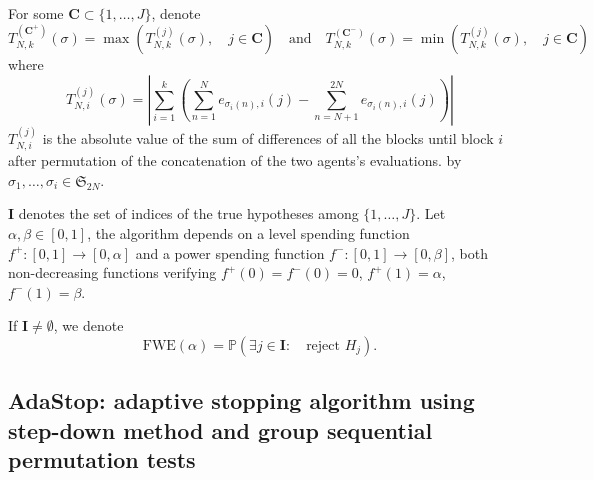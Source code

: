 \documentclass{article}
\theoremstyle{plain}
\theoremstyle{remark}
\renewcommand{\P}{\mathbb{P}}
\renewcommand{\S}{\mathfrak{S}}
\newcommand{\1}{\mathbbm{1}}
\numberwithin{equation}{section}
\begin{document}
For some $\textbf{C} \subset \{1,\dots,J\}$, denote
$$T_{N,k}^{(\textbf{C}^+)}(\sigma)= \max\left(T_{N,k}^{(j)}(\sigma),\quad j \in \textbf{C}\right) \quad \text{and}\quad T_{N,k}^{(\textbf{C}^-)}(\sigma)= \min\left(T_{N,k}^{(j)}(\sigma),\quad j \in \textbf{C}\right)$$
where 
$$T_{N,i}^{(j)}(\sigma)= \left|\sum_{i=1}^k\left(\sum_{n=1}^{N} e_{\sigma_i(n),i}(j)-\sum_{n=N+1}^{2N} e_{\sigma_i(n),i}(j)\right)\right|$$ 
$T_{N,i}^{(j)}$ is the absolute value of the sum of differences of all the blocks until block $i$ after permutation of the concatenation of the two agents's evaluations. by $\sigma_1,\dots,\sigma_i\in \S_{2N}$.
 
$\textbf{I}$ denotes the set of indices of the true hypotheses among $\{1,\dots,J\}$. Let $\alpha, \beta \in [0,1]$, the algorithm depends on a level spending function $f^+:[0,1]\to[0,\alpha]$ and a power spending function $f^-:[0,1]\to [0,\beta]$, both non-decreasing functions verifying $f^+(0)=f^-(0)=0$, $f^+(1)=\alpha$, $f^-(1)=\beta$. 

If $\textbf{I} \neq \emptyset$, we denote 
$$\mathrm{FWE}(\alpha) = \P\left(\exists j \in \textbf{I}:\quad  \text{reject }H_j \right).$$
\subsection{AdaStop: adaptive stopping algorithm using step-down method and group sequential permutation tests}
\end{document}
